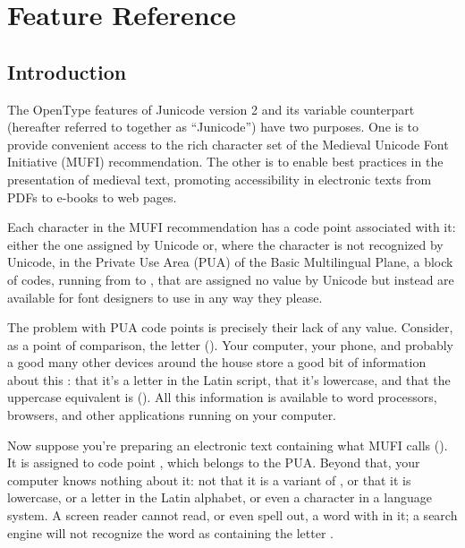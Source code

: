 
\chapter{Feature Reference}\hypertarget{FeatureReference}{}

\section{Introduction}
The OpenType features of Junicode version 2 and its variable counterpart (hereafter referred to together as
“Junicode”) have two purposes. One is to provide convenient access to the rich character set of the Medieval Unicode
Font Initiative (MUFI) recommendation. The other is to enable best practices in the presentation of medieval text,
promoting accessibility in electronic texts from PDFs to e-books to web pages.

Each character in the MUFI recommendation has a code point associated with it: either the one
assigned by Unicode or, where the character is not recognized by Unicode, in the Private Use Area (PUA) of the Basic
Multilingual Plane, a block of codes, running from  to , that are assigned no value by Unicode but instead
are available for font designers to use in any way they please.

The problem with PUA code points is precisely their lack of any value. Consider, as a point of comparison, the letter
 (). Your computer, your phone, and probably a good many other devices around the house
store a good bit of information about this : that it’s a letter in the Latin script, that
it’s lowercase, and that the uppercase equivalent is  (). All this information is
available to word processors, browsers, and other applications running on your computer.

Now suppose you're preparing an electronic text containing what MUFI calls  (). It is assigned to code point , which belongs to the PUA. Beyond that, your
computer knows nothing about it: not that it is a variant of , or that it is lowercase, or a letter in the Latin
alphabet, or even a character in a language system. A screen reader cannot read, or even spell out, a word with 
in it; a search engine will not recognize the word as containing the letter .

